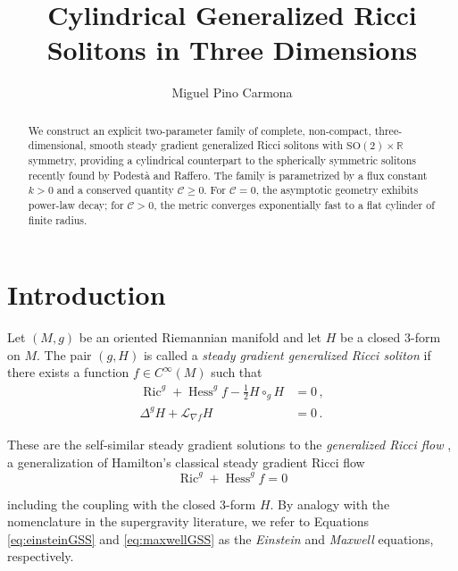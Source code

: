 \documentclass[12pt,a4paper,reqno]{amsart}
\title{Cylindrical Generalized Ricci Solitons in Three Dimensions}
\author[Miguel Pino Carmona]{Miguel Pino Carmona}
\date{}
\theoremstyle{plain}
\theoremstyle{remark}
\numberwithin{equation}{section}
\newcommand{\cC}{\mathcal{C}}
\newcommand{\cL}{\mathcal{L}}
\newcommand{\SO}{\mathrm{SO}}
\newcommand{\R}{\mathbb{R}}
\DeclareMathOperator{\Ric}{\mathrm{Ric}}
\DeclareMathOperator{\Hess}{\mathrm{Hess}}
\begin{document}
\begin{abstract}
We construct an explicit two-parameter family of complete, non-compact, three-dimensional, smooth steady gradient generalized Ricci solitons with $\SO(2)\times\R$ symmetry, providing a cylindrical counterpart to the spherically symmetric solitons recently found by Podestà and Raffero. The family is parametrized by a flux constant $k>0$ and a conserved quantity $\cC\ge 0$. For $\cC=0$, the asymptotic geometry exhibits power-law decay; for $\cC>0$, the metric converges exponentially fast to a flat cylinder of finite radius.
\end{abstract}

\maketitle
\setcounter{tocdepth}{1} %
\tableofcontents

\section{Introduction}
\label{sec:introduction}

Let $(M, g)$ be an oriented Riemannian manifold and let $H$ be a closed 3-form on $M$. The pair $(g, H)$ is called a \emph{steady gradient generalized Ricci soliton} \cite{GarciaFernandezStreets2021,PodestaRaffero2025} if there exists a function $f \in C^\infty(M)$ such that
\begin{align}
\Ric^g + \Hess^g f - \frac{1}{2}H \circ_g H &= 0 \,, \label{eq:einsteinGSS} \\
\Delta^g H + \cL_{\nabla f} H &= 0 \,. \label{eq:maxwellGSS}
\end{align}

These are the self-similar steady gradient solutions to the \emph{generalized Ricci flow} \cite{GarciaFernandezStreets2021}, a generalization of Hamilton's classical steady gradient Ricci flow \cite{Hamilton1995}
\begin{equation*}
\Ric^g + \Hess^g f = 0    
\end{equation*}

including the coupling with the closed $3$-form $H$. By analogy with the nomenclature in the supergravity literature, we refer to Equations \eqref{eq:einsteinGSS} and \eqref{eq:maxwellGSS} as the \emph{Einstein} and \emph{Maxwell} equations, respectively.
\end{document}
